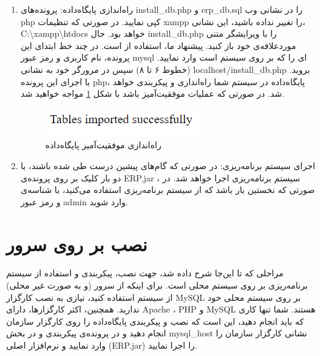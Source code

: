 \begin{enumerate}
		
	\item راه‌اندازی پایگاه‌داده:
	پرونده‌های install\_db.php و erp\_db.sql را در نشانی وب php کپی نمایید. در صورتی که تنظیمات xampp را تغییر نداده باشید، این نشانی، 
	  C:\textbackslash{}xampp\textbackslash{}htdocs خواهد بود. حال install\_db.php را با ویرایشگر متنی موردعلاقه‌ی خود باز کنید. پیشنهاد ما، استفاده از
	است. در چند خط ابتدای این پرونده، نام کاربری و رمز عبور mysql ای را که بر روی سیستم است وارد نمایید. (خطوط ۶ تا ۸)
	 سپس در مرورگر خود به نشانی
	localhost/install\_db.php
	بروید. با اجرای این پرونده php، پایگاه‌داده در سیستم شما راه‌اندازی و پیکربندی خواهد شد. در صورتی که عملیات موفقیت‌آمیز باشد با شکل 
	\ref{f15}
	مواجه خواهید شد.
			\begin{figure}[H]
				\centering
				\includegraphics[scale=0.7]{img/install/db}
				\caption{راه‌اندازی موفقیت‌آمیز پایگاه‌داده}
				\label{f15}
			\end{figure}
	
	\item اجرای سیستم برنامه‌ریزی: 
در صورتی که گام‌های پیشین درست طی شده باشند، با دو بار کلیک بر روی پرونده‌ی ERP.jar ، سیستم برنامه‌ریزی اجرا خواهد شد. در صورتی که نخستین بار باشد که از سیستم برنامه‌ریزی استفاده می‌کنید، با  شناسه‌ی
  و رمز عبور admin وارد شوید. 
	
\end{enumerate}

\section{نصب بر روی سرور}
مراحلی که تا این‌جا شرح داده شد، جهت نصب، پیکربندی و استفاده از سیستم برنامه‌ریزی بر روی سیستم محلی است. برای اینکه از سرور (و به صورت غیر محلی) از سیستم استفاده کنید، نیازی به نصب کارگزار  MySQL بر روی سیستم محلی خود ندارید. همچنین، اکثر کارگزارها، دارای Apache ، PHP و  MySQL هستند. شما تنها کاری که باید انجام دهید، این است که نصب و پیکربندی پایگاه‌داده را روی کارگزار سازمان انجام دهید و در پرونده‌ی پیکربندی و در بخش  mysql\_host نشانی کارگزار سازمان را وارد نمایید و نرم‌افزار اصلی (ERP.jar) را اجرا نمایید.

